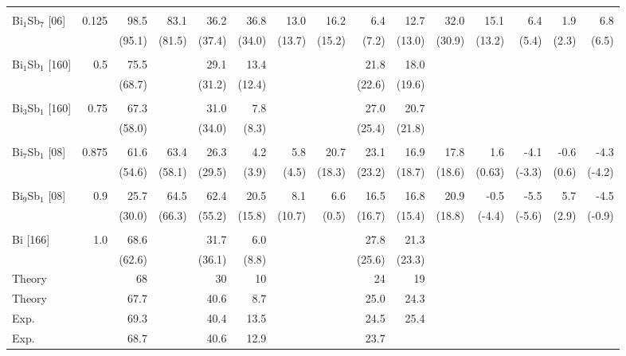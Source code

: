 \documentclass[twocolumn,superscriptaddress,nofootinbib,floatfix,aps,showpacs,prb,citeautoscript,reprint]{revtex4-1}
\begin{document}
\begin{table*}[hbt!]
\begin{adjustbox}{width=1.0\textwidth, center=\textwidth }
\begin{threeparttable}
\begin{tabular}{lrrrrrrrrrrrrrr}
\hline\\
\multirow{2}{*}{Bi$_{1}$Sb$_{7}$ [06]}  & \multirow{2}{*}{0.125} & 98.5 & 83.1 &  36.2 &	36.8 &  13.0 & 16.2  &  6.4  & 12.7  & 32.0 & 15.1 & 6.4 & 1.9 & 6.8 \\
				&							&	(95.1) &	(81.5) &	(37.4) &	(34.0) &	(13.7) &	(15.2) &	(7.2) &	(13.0) &	(30.9) & (13.2) & (5.4) & (2.3) & (6.5) \\ 
\hline\\
\multirow{2}{*}{Bi$_{1}$Sb$_{1}$ [160]}  & \multirow{2}{*}{0.5} & 75.5 &  & 29.1 & 13.4 &  &  & 21.8 & 18.0 & & & &  & \\
				& 		       & (68.7) &  & (31.2) & (12.4) &  &  & (22.6) & (19.6) & & & & & \\
\hline\\
\multirow{2}{*}{Bi$_{3}$Sb$_{1}$ [160]}  & \multirow{2}{*}{0.75} & 67.3 &  & 31.0 & 7.8 &  &  & 27.0 & 20.7 & & & & &  \\
				& 		       & (58.0) &  & (34.0) & (8.3) &  &  & (25.4) & (21.8) & & & & & \\ 
\hline\\
\multirow{2}{*}{Bi$_{7}$Sb$_{1}$ [08]}  & \multirow{2}{*}{0.875} & 61.6 &  63.4 & 26.3 & 4.2 & 5.8 &  20.7  & 23.1 & 16.9 & 17.8 & 1.6 & -4.1 & -0.6 & -4.3 \\
				& 		            & (54.6) &	(58.1) &	(29.5) & (3.9) & (4.5) & (18.3) & (23.2) & (18.7) & (18.6) & (0.63) & (-3.3) & (0.6) & (-4.2) \\
\hline\\
\multirow{2}{*}{Bi$_{9}$Sb$_{1}$ [08]}  & \multirow{2}{*}{0.9} & 25.7 &  64.5 & 62.4 & 20.5 & 8.1 &  6.6  & 16.5 & 16.8 & 20.9 & -0.5 & -5.5 & 5.7 & -4.5  \\
				& 		       & (30.0) &	(66.3) &	(55.2) & (15.8) & (10.7) & (0.5) & (16.7) & (15.4) & (18.8) & (-4.4) & (-5.6) & (2.9) & (-0.9)  \\
\hline\\
\multirow{2}{*}{Bi [166]}  & \multirow{2}{*}{1.0} & 68.6 &  & 31.7 & 6.0 &  &   & 27.8	& 21.3 & & \\
				& 		       & (62.6) &  & (36.1) & (8.8) &  &  & (25.6) & (23.3) & & \\ 
\hspace{1cm} Theory\tnote{a} 	&    & 68 &  & 30 & 10 &  &  & 24 & 19 &  &  \\
\hspace{1cm} Theory\tnote{b} 	&    & 67.7 &  & 40.6 & 8.7 &  &  & 25.0 & 24.3 &  & \\
\hspace{1cm} Exp.\tnote{c} 	&   & 69.3 &  & 40.4 & 13.5 &  &  & 24.5 & 25.4 & &  \\
\hspace{1cm} Exp.\tnote{d} 	&   & 68.7 &  & 40.6 & 12.9 &  &  & 23.7 &  & &  \\ 


\end{tabular}
\end{threeparttable}
\end{adjustbox}
\end{table*}
\end{document}
